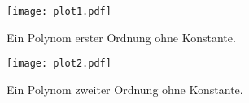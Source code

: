 \documentclass{scrartcl}
\begin{document}
\begin{figure}
  \centering
  \texttt{[image: plot1.pdf]}
  \caption{Ein Polynom erster Ordnung ohne Konstante.}
\end{figure}

\begin{figure}
  \centering
  \texttt{[image: plot2.pdf]}
  \caption{Ein Polynom zweiter Ordnung ohne Konstante.}
\end{figure}
\end{document}
